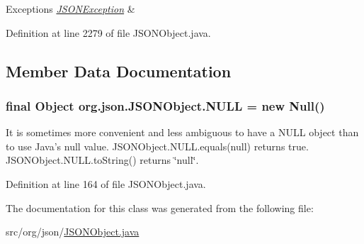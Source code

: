 \begin{DoxyExceptions}{Exceptions}
{\em \hyperlink{classorg_1_1json_1_1JSONException}{J\-S\-O\-N\-Exception}} & \\
\hline
\end{DoxyExceptions}


Definition at line 2279 of file J\-S\-O\-N\-Object.\-java.



\subsection{Member Data Documentation}
\hypertarget{classorg_1_1json_1_1JSONObject_a01c74a31a1abfd34ab13beb9347855ac}{
\subsubsection[{N\-U\-L\-L}]{\setlength{\rightskip}{0pt plus 5cm}final Object org.\-json.\-J\-S\-O\-N\-Object.\-N\-U\-L\-L = new Null()\hspace{0.3cm}{\ttfamily [static]}}}\label{classorg_1_1json_1_1JSONObject_a01c74a31a1abfd34ab13beb9347855ac}
It is sometimes more convenient and less ambiguous to have a {\ttfamily N\-U\-L\-L} object than to use Java's {\ttfamily null} value. {\ttfamily J\-S\-O\-N\-Object.\-N\-U\-L\-L.\-equals(null)} returns {\ttfamily true}. {\ttfamily J\-S\-O\-N\-Object.\-N\-U\-L\-L.\-to\-String()} returns {\ttfamily \char`\"{}null\char`\"{}}. 

Definition at line 164 of file J\-S\-O\-N\-Object.\-java.



The documentation for this class was generated from the following file\-:\begin{DoxyCompactItemize}
\item 
src/org/json/\hyperlink{JSONObject_8java}{J\-S\-O\-N\-Object.\-java}\end{DoxyCompactItemize}
